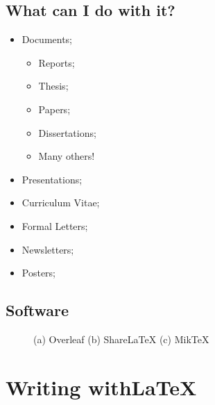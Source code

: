 \documentclass{article}
\begin{document}
\subsection{What can I do with it?}
\begin{itemize}
    \item Documents;
    \begin{itemize}
        \item Reports;
        \item Thesis;
        \item Papers;
        \item Dissertations;
        \item Many others!
    \end{itemize}
    \item Presentations;
    \item Curriculum Vitae;
    \item Formal Letters;
    \item Newsletters;
    \item Posters;

\end{itemize}


\subsection{Software}
\begin{figure}[h!]
\centering
{} 
\caption{(a) Overleaf (b) ShareLaTeX (c) MikTeX}
\end{figure}


\newpage    

\section{Writing with\LaTeX}
\end{document}

